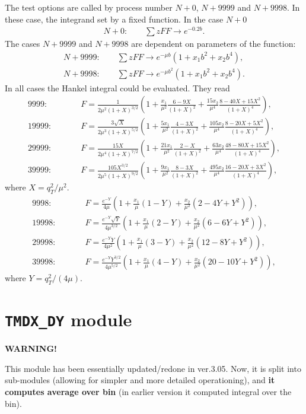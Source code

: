 \documentclass[prd,nofootinbib,eqsecnum,final]{revtex4}
\renewcommand{\(}{\left(}
\renewcommand{\)}{\right)}
\renewcommand{\[}{\left[}
\renewcommand{\]}{\right]}
\begin{document}
The test options are called by process number $N+0$, $N+9999$ and $N+9998$. In these case, the integrand set by a fixed function. In the case $N+0$
\begin{eqnarray}
N+0:\qquad \sum z FF \to e^{-0.2b}.
\end{eqnarray}
The cases $N+9999$ and $N+9998$ are dependent on parameters of the function:
\begin{eqnarray}
N+9999:\qquad \sum z FF \to e^{-\mu b}(1+x_1 b^2+x_2 b^4),
\\
N+9998:\qquad \sum z FF \to e^{-\mu b^2}(1+x_1 b^2+x_2 b^4).
\end{eqnarray}
In all cases the Hankel integral could be evaluated. They read
\begin{eqnarray}
\text{9999}:&\qquad& F=\frac{1}{2\mu^2(1+X)^{3/2}}\(1+\frac{x_1}{\mu^2}\frac{6-9X}{(1+X)^2}+\frac{15x_2}{\mu^4}\frac{8-40X+15 X^2}{(1+X)^4}\),
\\
\text{19999}:&\qquad& F=\frac{3\sqrt{X}}{2\mu^3(1+X)^{5/2}}\(1+\frac{5x_1}{\mu^2}\frac{4-3X}{(1+X)^2}+\frac{105x_2}{\mu^4}\frac{8-20X+5 X^2}{(1+X)^4}\),
\\
\text{29999}:&\qquad& F=\frac{15 X}{2\mu^4(1+X)^{7/2}}\(1+\frac{21x_1}{\mu^2}\frac{2-X}{(1+X)^2}+\frac{63x_2}{\mu^4}\frac{48-80X+15 X^2}{(1+X)^4}\),
\\
\text{39999}:&\qquad& F=\frac{105 X^{3/2}}{2\mu^5(1+X)^{9/2}}\(1+\frac{9x_1}{\mu^2}\frac{8-3X}{(1+X)^2}+\frac{495x_2}{\mu^4}\frac{16-20X+3 X^2}{(1+X)^4}\),
\end{eqnarray}
where $X=q_T^2/\mu^2$.
\begin{eqnarray}
\text{9998}:&\qquad& F=\frac{e^{-Y}}{4\mu}\(1+\frac{x_1}{\mu}(1-Y)+\frac{x_2}{\mu^2}(2-4Y+Y^2)\),
\\
\text{19998}:&\qquad& F=\frac{e^{-Y}\sqrt{Y}}{4\mu^{3/2}}\(1+\frac{x_1}{\mu}(2-Y)+\frac{x_2}{\mu^2}(6-6Y+Y^2)\),
\\
\text{29998}:&\qquad& F=\frac{e^{-Y}Y}{4\mu^2}\(1+\frac{x_1}{\mu}(3-Y)+\frac{x_2}{\mu^2}(12-8Y+Y^2)\),
\\
\text{39998}:&\qquad& F=\frac{e^{-Y}Y^{3/2}}{4\mu^{5/2}}\(1+\frac{x_1}{\mu}(4-Y)+\frac{x_2}{\mu^2}(20-10Y+Y^2)\),
\end{eqnarray}
where $Y=q_T^2/(4\mu)$.

\newpage
\section{\texttt{TMDX{\_}DY} module}
\label{TMDX}

\begin{tcolorbox}
\begin{center}
\textbf{WARNING!}
\end{center}
This module has been essentially updated/redone in ver.3.05. Now, it is split into sub-modules (allowing for simpler and more detailed operationing), and \textbf{it computes average over bin} (in earlier version it computed integral over the bin). 
\end{tcolorbox}
\end{document}
